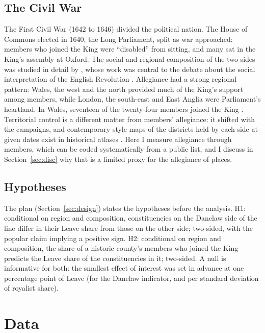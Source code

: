 \documentclass[11pt,a4paper]{article}
\begin{document}
\subsection{The Civil War}
The First Civil War (1642 to 1646) divided the political nation. The House of Commons elected in 1640, the Long Parliament, split as war approached: members who joined the King were ``disabled'' from sitting, and many sat in the King's assembly at Oxford. The social and regional composition of the two sides was studied in detail by \citet{brunton1954}, whose work was central to the debate about the social interpretation of the English Revolution \citep{zagorin1959}. Allegiance had a strong regional pattern: Wales, the west and the north provided much of the King's support among members, while London, the south-east and East Anglia were Parliament's heartland. In Wales, seventeen of the twenty-four members joined the King \citep{dodd1952,zagorin1959}. Territorial control is a different matter from members' allegiance: it shifted with the campaigns, and contemporary-style maps of the districts held by each side at given dates exist in historical atlases \citep{gardiner1914}. Here I measure allegiance through members, which can be coded systematically from a public list, and I discuss in Section~\ref{sec:disc} why that is a limited proxy for the allegiance of places.

\subsection{Hypotheses}
The plan (Section~\ref{sec:design}) states the hypotheses before the analysis. H1: conditional on region and composition, constituencies on the Danelaw side of the line differ in their Leave share from those on the other side; two-sided, with the popular claim implying a positive sign. H2: conditional on region and composition, the share of a historic county's members who joined the King predicts the Leave share of the constituencies in it; two-sided. A null is informative for both: the smallest effect of interest was set in advance at one percentage point of Leave (for the Danelaw indicator, and per standard deviation of royalist share).

\section{Data}\label{sec:data}
\end{document}
